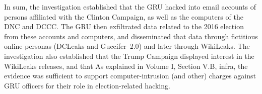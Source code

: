 \hr

In sum, the investigation established that the GRU hacked into email accounts of persons affiliated with the Clinton Campaign, as well as the computers of the DNC and DCCC\null.
The GRU then exfiltrated data related to the 2016 election from these accounts and computers, and disseminated that data through fictitious online personas (DCLeaks and Guccifer~2.0) and later through WikiLeaks.
The investigation also established that the Trump Campaign displayed interest in the WikiLeaks releases, and that 
As explained in Volume I, Section V.B, infra, the evidence was sufficient to support computer-intrusion (and other) charges against GRU officers for their role in election-related hacking.

